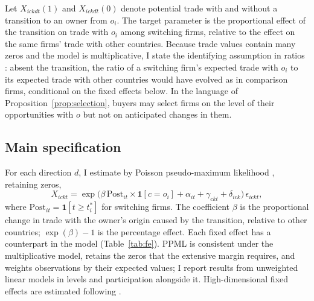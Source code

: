 \documentclass[12pt]{article}
\theoremstyle{remark}
\newcommand{\Post}{\mathrm{Post}}
\newcommand{\one}{\mathbf{1}}
\begin{document}
Let $X_{ickdt}(1)$ and $X_{ickdt}(0)$ denote potential trade with and without a
transition to an owner from $o_i$. The target parameter is the proportional
effect of the transition on trade with $o_i$ among switching firms, relative to
the effect on the same firms' trade with other countries. Because trade
values contain many zeros and the model is multiplicative, I state the
identifying assumption in ratios \citep{wooldridge2023}: absent the
transition, the ratio of a switching firm's expected trade with $o_i$ to its
expected trade with other countries would have evolved as in comparison firms,
conditional on the fixed effects below. In the language of
Proposition~\ref{prop:selection}, buyers may select firms on the level of
their opportunities with $o$ but not on anticipated changes in them.

\subsection{Main specification}

For each direction $d$, I estimate by Poisson pseudo-maximum likelihood
\citep{santossilva2006}, retaining zeros,
\begin{equation}
X_{ickt} = \exp\big(\beta\,\Post_{it}\times\one[c=o_i] + \alpha_{it} +
\gamma_{ckt} + \delta_{ick}\big)\,\epsilon_{ickt},
\label{eq:main}
\end{equation}
where $\Post_{it}=\one[t\geq t_i^*]$ for switching firms. The coefficient
$\beta$ is the proportional change in trade with the owner's origin caused by
the transition, relative to other countries; $\exp(\beta)-1$ is the
percentage effect. Each fixed effect has a counterpart in the model
(Table~\ref{tab:fe}). PPML is consistent under the multiplicative model,
retains the zeros that the extensive margin requires, and weights
observations by their expected values; I report results from unweighted
linear models in levels and participation alongside it. High-dimensional
fixed effects are estimated following \citet{correia2020}.
\end{document}
